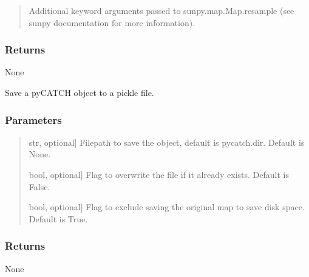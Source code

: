 \documentclass[letterpaper,10pt,english]{sphinxmanual}
\begin{document}
\begin{fulllineitems}
\begin{fulllineitems}
\begin{quote}
\begin{description}
\sphinxAtStartPar
Additional keyword arguments passed to sunpy.map.Map.resample (see sunpy documentation for more information).

\end{description}
\end{quote}


\subsubsection{Returns}
\label{\detokenize{pycatch/pycatch:id26}}
\sphinxAtStartPar
None

\end{fulllineitems}


\begin{fulllineitems}
\label{\detokenize{pycatch/pycatch:pycatch.pycatch.pycatch.save}}
\pysigstartsignatures
{}
\pysigstopsignatures
\sphinxAtStartPar
Save a pyCATCH object to a pickle file.


\subsubsection{Parameters}
\label{\detokenize{pycatch/pycatch:id27}}\begin{quote}
\begin{description}
\sphinxlineitem{file}{[}str, optional{]}
\sphinxAtStartPar
Filepath to save the object, default is pycatch.dir. Default is None.

\sphinxlineitem{overwrite}{[}bool, optional{]}
\sphinxAtStartPar
Flag to overwrite the file if it already exists. Default is False.

\sphinxlineitem{no\_original}{[}bool, optional{]}
\sphinxAtStartPar
Flag to exclude saving the original map to save disk space. Default is True.

\end{description}
\end{quote}


\subsubsection{Returns}
\label{\detokenize{pycatch/pycatch:id28}}
\sphinxAtStartPar
None


\end{fulllineitems}
\end{fulllineitems}
\end{document}
